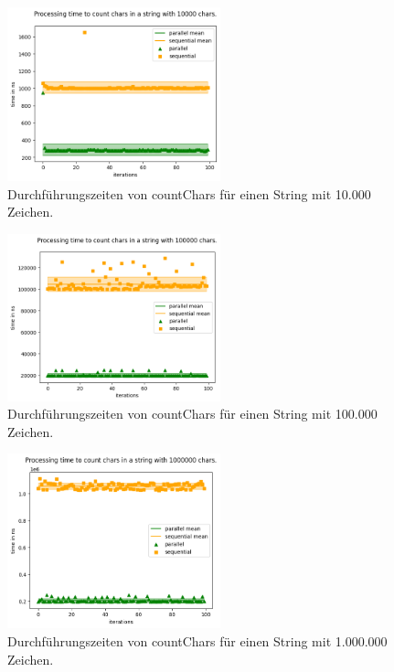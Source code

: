 \documentclass[plainarticle,zihtitle,german,final,hyperref,utf8]{zihpub}
\begin{document}
\begin{figure}[h]
	\begin{center}
		\includegraphics[width=0.55\textwidth]{images/comp_count_10000.png}
		\caption{Durchführungszeiten von countChars für einen String mit 10.000 Zeichen.}
	\end{center}
\end{figure}
\begin{figure}[h]
	\begin{center}
		\includegraphics[width=0.55\textwidth]{images/comp_count_100000.png}
		\caption{Durchführungszeiten von countChars für einen String mit 100.000 Zeichen.}
	\end{center}
\end{figure}
\newpage
\begin{figure}[h]
	\begin{center}
		\includegraphics[width=0.55\textwidth]{images/comp_count_1000000.png}
		\caption{Durchführungszeiten von countChars für einen String mit 1.000.000 Zeichen.}		
	\end{center}
\end{figure}
\end{document}
